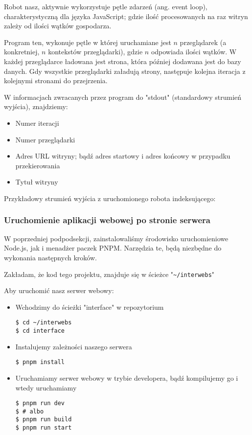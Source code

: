 \documentclass[a4paper, 12pt]{article}
\begin{document}
Robot nasz, aktywnie wykorzystuje pętle zdarzeń (ang. event loop), charakterystyczną dla języka JavaScript; gdzie ilość procesowanych na raz witryn zależy od ilości wątków gospodarza.

Program ten, wykonuje pętle w której uruchamiane jest \(n\) przeglądarek (a konkretniej, \(n\) kontekstów przeglądarki), gdzie \(n\) odpowiada ilości wątków. W każdej przeglądarce ładowana jest strona, która później dodawana jest do bazy danych. Gdy wszystkie przeglądarki załadują strony, następuje kolejna iteracja z kolejnymi stronami do przejrzenia.

W informacjach zwracanych przez program do "stdout" (standardowy strumień wyjścia), znajdziemy:
\begin{itemize}
 \item Numer iteracji
 \item Numer przeglądarki
 \item Adres URL witryny; bądź adres startowy i adres końcowy w przypadku przekierowania
 \item Tytuł witryny
\end{itemize}

Przykładowy strumień wyjścia z uruchomionego robota indeksującego:



\subsubsection{Uruchomienie aplikacji webowej po stronie serwera}

W poprzedniej podpodsekcji, zainstalowaliśmy środowisko uruchomieniowe Node.js, jak i menadżer paczek PNPM. Narzędzia te, będą niezbędne do wykonania następnych kroków.

Zakładam, że kod tego projektu, znajduje się w ścieżce "\lstinline{~/interwebs}"

Aby uruchomić nasz serwer webowy:
\begin{itemize}
 \item Wchodzimy do ścieżki "interface" w repozytorium
 \begin{lstlisting}
$ cd ~/interwebs
$ cd interface
 \end{lstlisting}
 \item Instalujemy zależności naszego serwera
 \begin{lstlisting}
$ pnpm install
 \end{lstlisting}
 \item Uruchamiamy serwer webowy w trybie developera, bądź kompilujemy go i wtedy uruchamiamy
 \begin{lstlisting}
$ pnpm run dev
$ # albo
$ pnpm run build
$ pnpm run start
 \end{lstlisting}
\end{itemize}
\end{document}
